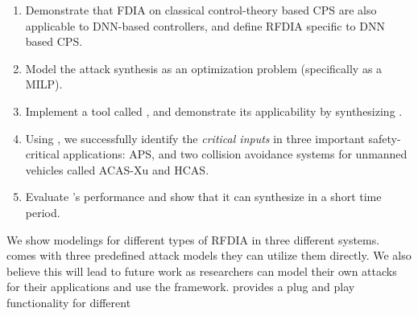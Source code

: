 \begin{enumerate}
	\item Demonstrate that FDIA on classical control-theory based CPS are also applicable to DNN-based controllers, and define RFDIA specific to DNN based CPS. %
	\item Model the attack synthesis as an optimization problem (specifically as a MILP). %
	
	\item Implement a tool called \tool, and demonstrate its applicability by synthesizing \attack.%
	\item Using \tool, we successfully identify the \textit{critical inputs} in three important safety-critical applications: \ac{APS},  and  two collision avoidance systems for unmanned vehicles called \ac{ACAS-Xu} and \ac{HCAS}.
	\item Evaluate \tool's performance and show that it can synthesize \attack in a short time period.   %
\end{enumerate}

We show modelings for different types of RFDIA in three different systems. \tool comes with three predefined attack models they can utilize them directly. We also believe this will lead to future work as researchers can model their own attacks for their applications and use the framework. \tool provides a plug and play functionality for different 

